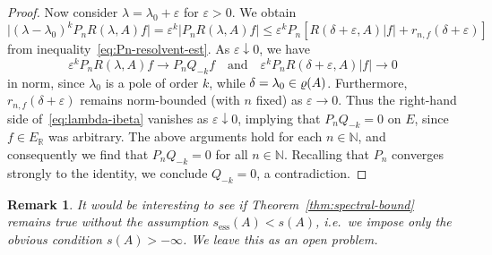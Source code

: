 \documentclass[sn-mathphys]{sn-jnl}%
\theoremstyle{thmstyleone}
\theoremstyle{thmstylethree}
\newtheorem{remark}[theorem]{Remark}
\let\Re\relax
\DeclareMathOperator{\Re}{Re}
\newcommand{\NN}{\mathbb{N}}
\newcommand{\RR}{\mathbb{R}}
\begin{document}
\begin{proof}
	Now consider $\lambda=\lambda_0+\varepsilon$ for $\varepsilon >0$. We obtain
	\begin{equation}
		\label{eq:lambda-ibeta}
		\lvert(\lambda-\lambda_0)^kP_n R(\lambda,A)f\rvert = \varepsilon^k \lvert P_n R(\lambda,A)f\rvert \le \varepsilon^k P_n[R(\delta+\varepsilon,A)\lvert f\rvert+r_{n,f}(\delta+\varepsilon)]
	\end{equation}
	from inequality~\eqref{eq:Pn-resolvent-est}. As $\varepsilon\downarrow 0$, we have
	\begin{equation*}
		\varepsilon^k P_n R(\lambda,A)f \longrightarrow P_n Q_{-k}f \quad\text{and}\quad \varepsilon^k P_n R(\delta+\varepsilon,A)\lvert f\rvert\longrightarrow 0
	\end{equation*}
	in norm, since $\lambda_0$ is a pole of order $k$, while $\delta=\Re\lambda_0 \in\varrho(A)$. Furthermore, $r_{n,f}(\delta+\varepsilon)$ remains norm-bounded (with $n$ fixed) as $\varepsilon\to 0$. Thus the right-hand side of~\eqref{eq:lambda-ibeta} vanishes as $\varepsilon\downarrow 0$, implying that $P_n Q_{-k}=0$ on $E$, since $f\in E_\RR$ was arbitrary. The above arguments hold for each $n\in\NN$, and consequently we find that $P_n Q_{-k}=0$ for all $n\in\NN$. Recalling that $P_n$ converges strongly to the identity, we conclude $Q_{-k}=0$, a contradiction.
\end{proof}

\begin{remark}
	It would be interesting to see if Theorem~\ref{thm:spectral-bound} remains true without the assumption $s_{\mathrm{ess}}(A)<s(A)$, i.e.\ we impose only the obvious condition $s(A)>-\infty$. We leave this as an open problem.
\end{remark}
\end{document}
